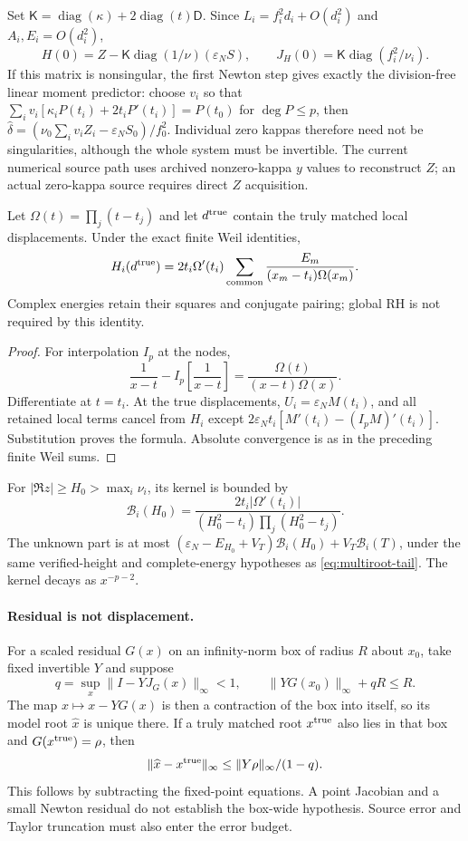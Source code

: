 Set $\mathsf K=\operatorname{diag}(\kappa)
+2\operatorname{diag}(t)\mathsf D$. Since $L_i=f_i^2d_i+O(d_i^2)$
and $A_i,E_i=O(d_i^2)$,
\[
 H(0)=Z-\mathsf K\operatorname{diag}(1/\nu)(\varepsilon_NS),\qquad
 J_H(0)=\mathsf K\operatorname{diag}(f_i^2/\nu_i).
\]
If this matrix is nonsingular, the first Newton step gives exactly the
division-free linear moment predictor: choose $v_i$ so that
$\sum_i v_i[\kappa_iP(t_i)+2t_iP'(t_i)]=P(t_0)$ for $\deg P\le p$,
then $\widehat\delta=(\nu_0\sum_i v_iZ_i-\varepsilon_NS_0)/f_0^2$.
Individual zero kappas therefore need not be singularities, although the
whole system must be invertible. The current numerical source path uses
archived nonzero-kappa $y$ values to reconstruct $Z$; an actual zero-kappa
source requires direct $Z$ acquisition.

\begin{proposition}
\label{prop:nonlinear-common-defect}
Let $\Omega(t)=\prod_j(t-t_j)$ and let $d^{\rm true}$ contain the truly
matched local displacements. Under the exact finite Weil identities,
\begin{equation}\label{eq:nonlinear-common-defect}
 H_i(d^{\rm true})=2t_i\Omega'(t_i)
       \sum_{\rm common}\frac{E_m}{(x_m-t_i)\Omega(x_m)}.
\end{equation}
Complex energies retain their squares and conjugate pairing; global RH
is not required by this identity.
\end{proposition}
\begin{proof}
For interpolation $I_p$ at the nodes,
\[
 \frac1{x-t}-I_p\!\left[\frac1{x-t}\right]
           =\frac{\Omega(t)}{(x-t)\Omega(x)}.
\]
Differentiate at $t=t_i$. At the true displacements,
$U_i=\varepsilon_NM(t_i)$, and all retained local terms cancel from
$H_i$ except $2\varepsilon_Nt_i[M'(t_i)-(I_pM)'(t_i)]$.
Substitution proves the formula. Absolute convergence is as in the
preceding finite Weil sums.
\end{proof}
For $|\Re z|\ge H_0>\max_i\nu_i$, its kernel is bounded by
\[
 \mathcal B_i(H_0)=\frac{2t_i|\Omega'(t_i)|}
       {(H_0^2-t_i)\prod_j(H_0^2-t_j)}.
\]
The unknown part is at most
$(\varepsilon_N-E_{H_0}+V_T)\mathcal B_i(H_0)+V_T\mathcal B_i(T)$,
under the same verified-height and complete-energy hypotheses as
\eqref{eq:multiroot-tail}. The kernel decays as $x^{-p-2}$.

\paragraph{Residual is not displacement.}
For a scaled residual $G(x)$ on an infinity-norm box of radius $R$ about
$x_0$, take fixed invertible $Y$ and suppose
\[
 q=\sup_x\|I-YJ_G(x)\|_\infty<1,\qquad
 \|YG(x_0)\|_\infty+qR\le R.
\]
The map $x\mapsto x-YG(x)$ is then a contraction of the box into itself,
so its model root $\widehat x$ is unique there. If a truly matched root
$x^{\rm true}$ also lies in that box and $G(x^{\rm true})=\rho$, then
\[
 \|\widehat x-x^{\rm true}\|_\infty
               \le\|Y\rho\|_\infty/(1-q).
\]
This follows by subtracting the fixed-point equations. A point Jacobian
and a small Newton residual do not establish the box-wide hypothesis.
Source error and Taylor truncation must also enter the error budget.

